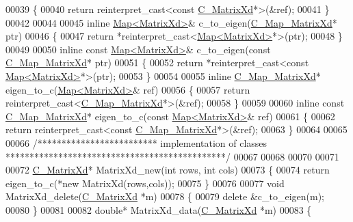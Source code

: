 \begin{DoxyCode}
00039 \{
00040   \textcolor{keywordflow}{return} \textcolor{keyword}{reinterpret\_cast<}\textcolor{keyword}{const }\hyperlink{struct_c___matrix_xd}{C\_MatrixXd}*\textcolor{keyword}{>}(&ref);
00041 \}
00042 
00044 
00045 \textcolor{keyword}{inline} \hyperlink{group___core___module_class_eigen_1_1_map}{Map<MatrixXd>}& c\_to\_eigen(\hyperlink{struct_c___map___matrix_xd}{C\_Map\_MatrixXd}* ptr)
00046 \{
00047   \textcolor{keywordflow}{return} *\textcolor{keyword}{reinterpret\_cast<}\hyperlink{group___core___module_class_eigen_1_1_map}{Map<MatrixXd>}*\textcolor{keyword}{>}(ptr);
00048 \}
00049 
00050 \textcolor{keyword}{inline} \textcolor{keyword}{const} \hyperlink{group___core___module_class_eigen_1_1_map}{Map<MatrixXd>}& c\_to\_eigen(\textcolor{keyword}{const} \hyperlink{struct_c___map___matrix_xd}{C\_Map\_MatrixXd}* ptr)
00051 \{
00052   \textcolor{keywordflow}{return} *\textcolor{keyword}{reinterpret\_cast<}\textcolor{keyword}{const }\hyperlink{group___core___module_class_eigen_1_1_map}{Map<MatrixXd>}*\textcolor{keyword}{>}(ptr);
00053 \}
00054 
00055 \textcolor{keyword}{inline} \hyperlink{struct_c___map___matrix_xd}{C\_Map\_MatrixXd}* eigen\_to\_c(\hyperlink{group___core___module_class_eigen_1_1_map}{Map<MatrixXd>}& ref)
00056 \{
00057   \textcolor{keywordflow}{return} \textcolor{keyword}{reinterpret\_cast<}\hyperlink{struct_c___map___matrix_xd}{C\_Map\_MatrixXd}*\textcolor{keyword}{>}(&ref);
00058 \}
00059 
00060 \textcolor{keyword}{inline} \textcolor{keyword}{const} \hyperlink{struct_c___map___matrix_xd}{C\_Map\_MatrixXd}* eigen\_to\_c(\textcolor{keyword}{const} \hyperlink{group___core___module_class_eigen_1_1_map}{Map<MatrixXd>}& ref)
00061 \{
00062   \textcolor{keywordflow}{return} \textcolor{keyword}{reinterpret\_cast<}\textcolor{keyword}{const }\hyperlink{struct_c___map___matrix_xd}{C\_Map\_MatrixXd}*\textcolor{keyword}{>}(&ref);
00063 \}
00064 
00065 
00066 \textcolor{comment}{/************************* implementation of classes **********************************************/}
00067 
00068 
00070 
00071 
00072 \hyperlink{struct_c___matrix_xd}{C\_MatrixXd}* MatrixXd\_new(\textcolor{keywordtype}{int} rows, \textcolor{keywordtype}{int} cols)
00073 \{
00074   \textcolor{keywordflow}{return} eigen\_to\_c(*\textcolor{keyword}{new} MatrixXd(rows,cols));
00075 \}
00076 
00077 \textcolor{keywordtype}{void} MatrixXd\_delete(\hyperlink{struct_c___matrix_xd}{C\_MatrixXd} *m)
00078 \{
00079   \textcolor{keyword}{delete} &c\_to\_eigen(m);
00080 \}
00081 
00082 \textcolor{keywordtype}{double}* MatrixXd\_data(\hyperlink{struct_c___matrix_xd}{C\_MatrixXd} *m)
00083 \{

\end{DoxyCode}
